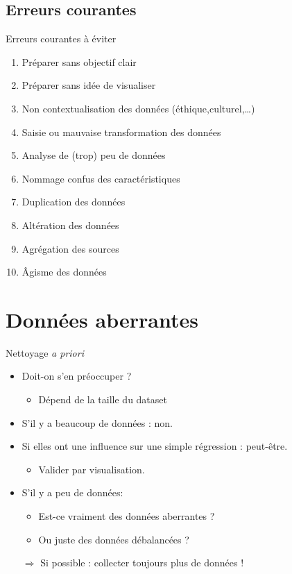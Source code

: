 \documentclass[french]{beamer}
\begin{document}
\subsection{Erreurs courantes}
\begin{frame}{Erreurs courantes à éviter}
\vspace{-1em}
	\begin{enumerate}
		\item Préparer sans objectif clair
		\item Préparer sans idée de visualiser
		\item Non contextualisation des données (éthique,culturel,\ldots)
		\item Saisie ou mauvaise transformation des données
		\item Analyse de (trop) peu de données
		\item Nommage confus des caractéristiques
		\item Duplication des données
		\item Altération des données
		\item Agrégation des sources
		\item Âgisme des données
	\end{enumerate} 
\end{frame}

\section[Outliers]{Données aberrantes}

\begin{frame}{Nettoyage \textit{a priori}}
	\begin{itemize}
		\item Doit-on s'en préoccuper ?
		\begin{itemize}
			\item Dépend de la taille du dataset
		\end{itemize}
		\item S'il y a beaucoup de données : non.
		\item Si elles ont une influence sur une simple régression : peut-être. 
		\begin{itemize}
			\item Valider par visualisation.
		\end{itemize}	
		\item S'il y a peu de données: 
		\begin{itemize}
			\item Est-ce vraiment des données aberrantes ? 
			\item Ou juste des données débalancées ?
		\end{itemize}
		\item[$\Rightarrow$] Si possible : collecter toujours plus de données !
	\end{itemize}
\end{frame}
\end{document}
